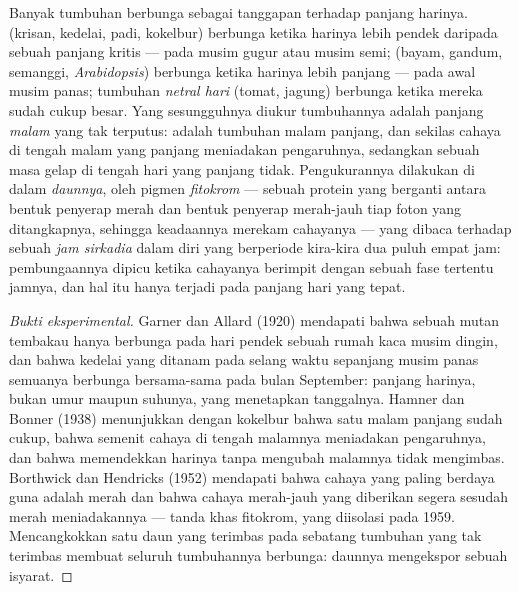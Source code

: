 \begin{proposition}\label{prop:b2:plant-flowering:photoperiod}
%
Banyak tumbuhan berbunga sebagai tanggapan terhadap panjang harinya.
\emph{} (krisan, kedelai, padi, kokelbur) berbunga
ketika harinya lebih pendek daripada sebuah panjang kritis --- pada
musim gugur atau musim semi; \emph{} (bayam,
gandum, semanggi, \emph{Arabidopsis}) berbunga ketika harinya lebih
panjang --- pada awal musim panas; tumbuhan \emph{netral hari} (tomat,
jagung) berbunga ketika mereka sudah cukup besar. Yang sesungguhnya
diukur tumbuhannya adalah panjang \emph{malam} yang tak terputus:
 adalah tumbuhan malam panjang, dan sekilas cahaya
di tengah malam yang panjang meniadakan pengaruhnya, sedangkan sebuah
masa gelap di tengah hari yang panjang tidak. Pengukurannya dilakukan
di dalam \emph{daunnya}, oleh pigmen \emph{fitokrom} --- sebuah protein
yang berganti antara bentuk penyerap merah dan bentuk penyerap
merah-jauh tiap foton yang ditangkapnya, sehingga keadaannya merekam
cahayanya --- yang dibaca terhadap sebuah \emph{jam sirkadia} dalam
diri yang berperiode kira-kira dua puluh empat jam: pembungaannya
dipicu ketika cahayanya berimpit dengan sebuah fase tertentu jamnya,
dan hal itu hanya terjadi pada panjang hari yang tepat.
\end{proposition}
\begin{proof}[Bukti eksperimental]
Garner dan Allard (1920) mendapati bahwa sebuah mutan tembakau hanya
berbunga pada hari pendek sebuah rumah kaca musim dingin, dan bahwa
kedelai yang ditanam pada selang waktu sepanjang musim panas semuanya
berbunga bersama-sama pada bulan September: panjang harinya, bukan umur
maupun suhunya, yang menetapkan tanggalnya. Hamner dan Bonner (1938)
menunjukkan dengan kokelbur bahwa satu malam panjang sudah cukup, bahwa
semenit cahaya di tengah malamnya meniadakan pengaruhnya, dan bahwa
memendekkan harinya tanpa mengubah malamnya tidak mengimbas. Borthwick
dan Hendricks (1952) mendapati bahwa cahaya yang paling berdaya guna
adalah merah dan bahwa cahaya merah-jauh yang diberikan segera sesudah
merah meniadakannya --- tanda khas fitokrom, yang diisolasi pada 1959.
Mencangkokkan satu daun yang terimbas pada sebatang tumbuhan yang tak
terimbas membuat seluruh tumbuhannya berbunga: daunnya mengekspor
sebuah isyarat.
\end{proof}

